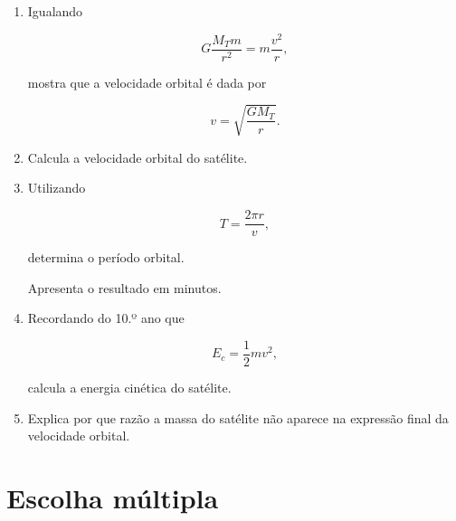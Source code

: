 \documentclass[11pt,a4paper]{article}
\newcommand{\resposta}[1][1]{
	\vspace{#1cm}
}
\begin{document}
	\begin{enumerate}[label=\textbf{\arabic*.},resume]
		
		\item Igualando
		
		\[
		G\frac{M_Tm}{r^2}
		=
		m\frac{v^2}{r},
		\]
		
		mostra que a velocidade orbital é dada por
		
		\[
		\boxed{
			v=
			\sqrt{\frac{GM_T}{r}}
		}.
		\]
		
		\resposta[1.1]
		
		\item Calcula a velocidade orbital do satélite.
		
		\resposta[1.2]
		
		\item Utilizando
		
		\[
		T=\frac{2\pi r}{v},
		\]
		
		determina o período orbital.
		
		Apresenta o resultado em minutos.
		
		\resposta[1.2]
		
		\item Recordando do 10.º ano que
		
		\[
		E_c=\frac{1}{2}mv^2,
		\]
		
		calcula a energia cinética do satélite.
		
		\resposta[1.2]
		
		\item Explica por que razão a massa do satélite não aparece na expressão
		final da velocidade orbital.
		
		\resposta[1.0]
		
	\end{enumerate}
	
	\section{Escolha múltipla}
	
\end{document}
